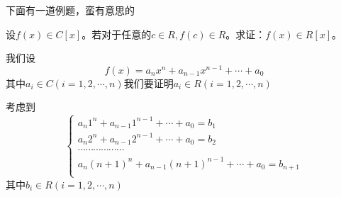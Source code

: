 \documentclass[lang=cn,10pt]{elegantbook}
\begin{document}
下面有一道例题，蛮有意思的
\begin{example}
	设$f(x)\in C[x]$。若对于任意的$c\in R,f(c)\in R$。求证：$f(x)\in R[x]$。
\end{example}
\begin{solution}
	我们设
	\begin{equation*}
		f(x)=a_nx^n+a_{n-1}x^{n-1}+\cdots+a_0
	\end{equation*}
	其中$a_{i}\in C(i=1,2,\cdots,n)$我们要证明$a_{i}\in R(i=1,2,\cdots,n)$
	
	考虑到
	\begin{equation*}
		\begin{cases}
			a_n1^n+a_{n-1}1^{n-1}+\cdots +a_0=b_1\\
			a_n2^n+a_{n-1}2^{n-1}+\cdots +a_0=b_2\\
			\cdots \cdots \cdots \cdots \cdots \cdots\\
			a_n\left( n+1 \right) ^n+a_{n-1}\left( n+1 \right) ^{n-1}+\cdots +a_0=b_{n+1}\\
		\end{cases}
	\end{equation*}
	其中$b_{i}\in R(i=1,2,\cdots,n)$
	

\end{solution}
\end{document}
